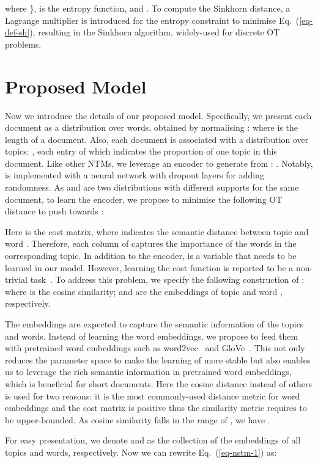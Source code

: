 \documentclass{article}
\begin{document}
where \},  is the entropy function, 
and .
To compute the Sinkhorn distance, a Lagrange multiplier is introduced for the entropy constraint to minimise Eq.~(\ref{eq-def-sh}), resulting in the Sinkhorn algorithm, widely-used for discrete OT problems.

\section{Proposed Model}
\label{sec-nstm}
Now we introduce the details of our proposed model.
Specifically, we present each document as a distribution over  words,  obtained by normalising :
  where  is the length of a document.
Also, each document is associated with a distribution over  topics: , each entry of which indicates the proportion of one topic in this document.
Like other NTMs, we leverage an encoder to generate  from : . Notably,  is implemented with a neural network with dropout layers for adding randomness.
As  and  are two distributions with different supports for the same document, to learn the encoder, we propose to minimise the following OT distance to push  towards :

Here  is the cost matrix,
where  indicates the semantic distance between topic  and word . Therefore, each column of  captures the importance of the words in the corresponding topic.
In addition to the encoder,  is a variable that needs to be learned in our model. However, learning the cost function is reported to be a non-trivial task~\citep{cuturi2014ground,sun2020learning}. To address this problem, we specify the following construction of :
 where  is the cosine similarity;  and  are the embeddings of topic  and word , respectively. 

The embeddings are expected to capture the semantic information of the topics and words.
Instead of learning the word embeddings, we propose to feed them with pretrained word embeddings such as word2vec~\citep{mikolov2013efficient} and GloVe~\citep{pennington2014glove}. This not only reduces the parameter space to make the learning of  more stable but also enables us to leverage the rich semantic information in pretrained word embeddings, which is beneficial for short documents.
Here the cosine distance instead of others is used for two reasons: it is the most commonly-used distance metric for word embeddings and the cost matrix   is positive thus the similarity metric requires to be upper-bounded. As cosine similarity falls in the range of , we have .


For easy presentation, we denote  and  as the collection of the embeddings of all topics and words, respectively. Now we can rewrite Eq.~(\ref{eq-nstm-1}) as:
\end{document}
